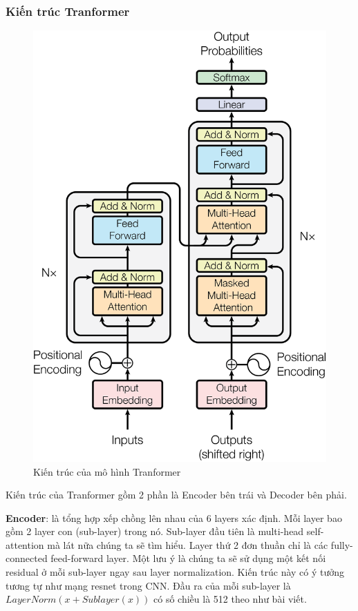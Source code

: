 \subsubsection{Kiến trúc Tranformer}
\begin{figure}[htb]
    \centering
    \includegraphics[width=\textwidth]{image/tranformer-architecture.png}
    \caption{Kiến trúc của mô hình Tranformer}
    \label{figure:tranformer-architecture}
\end{figure}



Kiến trúc của Tranformer gồm 2 phần là Encoder bên trái và Decoder bên phải.

\textbf{Encoder}: là tổng hợp xếp chồng lên nhau của 6 layers xác định. Mỗi layer bao gồm 2 layer con (sub-layer) trong nó. Sub-layer đầu tiên là multi-head self-attention mà lát nữa chúng ta sẽ tìm hiểu. Layer thứ 2 đơn thuần chỉ là các fully-connected feed-forward layer. Một lưu ý là chúng ta sẽ sử dụng một kết nối residual ở mỗi sub-layer ngay sau layer normalization. Kiến trúc này có ý tưởng tương tự như mạng resnet trong CNN. Đầu ra của mỗi sub-layer là $LayerNorm(x+Sublayer(x))$ có số chiều là 512 theo như bài viết.

